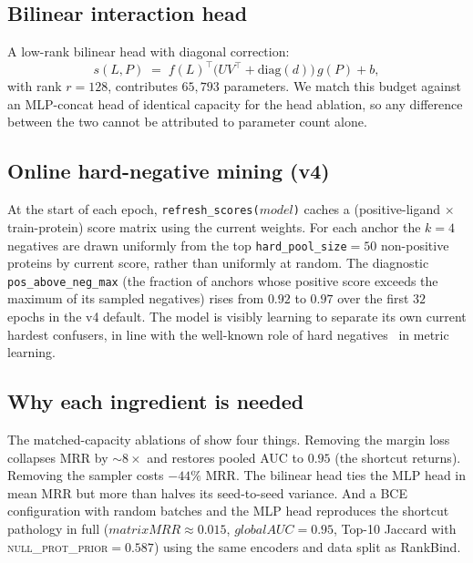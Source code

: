 \documentclass[11pt,a4paper]{article}
\newcommand{\method}{RankBind\xspace}
\newcommand{\nullprior}{\textsc{null\_prot\_prior}\xspace}
\newcommand{\gauc}{global AUC}
\newcommand{\matmrr}{matrix MRR}
\begin{document}
\subsection{Bilinear interaction head}

A low-rank bilinear head with diagonal correction:
\begin{equation}
s(L, P) \;=\; f(L)^{\top}\bigl(UV^{\top} + \mathrm{diag}(d)\bigr)\, g(P) + b,
\label{eq:bilinear}
\end{equation}
with rank $r=128$, contributes $65{,}793$ parameters. We match this
budget against an MLP-concat head of identical capacity for the head
ablation, so any difference between the two cannot be attributed to
parameter count alone.

\subsection{Online hard-negative mining (v4)}

At the start of each epoch, \texttt{refresh\_scores($\mathit{model}$)}
caches a (positive-ligand $\times$ train-protein) score matrix using
the current weights. For each anchor the $k=4$ negatives are drawn
uniformly from the top \texttt{hard\_pool\_size}$=50$ non-positive
proteins by current score, rather than uniformly at random. The
diagnostic \texttt{pos\_above\_neg\_max} (the fraction of anchors whose
positive score exceeds the maximum of its sampled negatives) rises from
$0.92$ to $0.97$ over the first $32$ epochs in the v4 default. The
model is visibly learning to separate its own current hardest
confusers, in line with the well-known role of hard
negatives~\citep{harwood2017smartmining,wu2017sampling} in metric
learning.

\subsection{Why each ingredient is needed}

The matched-capacity ablations of  show four things.
Removing the margin loss collapses MRR by $\sim\!8\times$ and restores
pooled AUC to $0.95$ (the shortcut returns). Removing the sampler
costs $-44\%$ MRR. The bilinear head ties the MLP head in mean MRR but
more than halves its seed-to-seed variance. And a BCE configuration
with random batches and the MLP head reproduces the shortcut pathology
in full ($\matmrr \approx 0.015$, $\gauc = 0.95$, Top-10 Jaccard with
\nullprior $= 0.587$) using the same encoders and data split as
\method.
\end{document}
